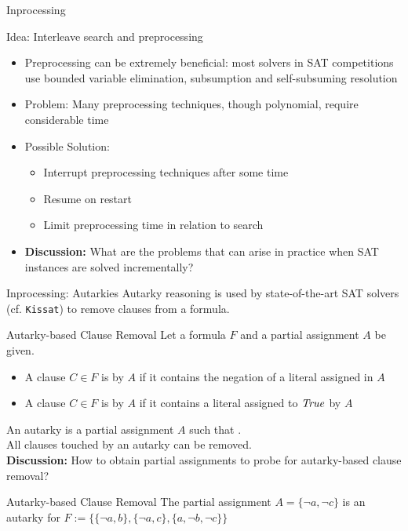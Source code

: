 \documentclass[t]{sdqbeamer}
\begin{document}
\begin{frame}{Inprocessing}
\begin{block}{Idea: Interleave search and preprocessing}
\begin{itemize}\setlength{\itemsep}{1em}
\item Preprocessing can be extremely beneficial: most solvers in SAT competitions use bounded variable elimination, subsumption and self-subsuming resolution
\item Problem: Many preprocessing techniques, though polynomial, require considerable time
\item Possible Solution:
\begin{itemize}\setlength{\itemsep}{1ex}
\item Interrupt preprocessing techniques after some time
\item Resume on restart
\item Limit preprocessing time in relation to search
\end{itemize}
\item \textbf{Discussion:} What are the problems that can arise in practice when SAT instances are solved incrementally?
\end{itemize}
\end{block}
\end{frame}

    
\begin{frame}{Inprocessing: Autarkies}
Autarky reasoning is used by state-of-the-art SAT solvers (cf. \texttt{Kissat}) to remove clauses from a formula.
\begin{block}{Autarky-based Clause Removal}
Let a formula $F$ and a partial assignment $A$ be given.\\[1ex]
\begin{itemize}\setlength{\itemsep}{1ex}
    \item A clause $C \in F$ is  by $A$ if it contains the negation of a literal assigned in $A$
    \item A clause $C \in F$ is  by $A$ if it contains a literal assigned to $\mathit{True}$ by $A$
\end{itemize}
An autarky is a partial assignment $A$ such that .\\
All clauses touched by an autarky can be removed.\\[1em]
\textbf{Discussion:} How to obtain partial assignments to probe for autarky-based clause removal?
\end{block}
\begin{exampleblock}{Autarky-based Clause Removal}
The partial assignment $A = \{ \lnot a, \lnot c \}$ is an autarky for $F := \bigl\{\{ \lnot a, b \}, \{ \lnot a, c \}, \{ a, \lnot b, \lnot c \}\bigr\}$
\end{exampleblock}
\end{frame}
\end{document}
